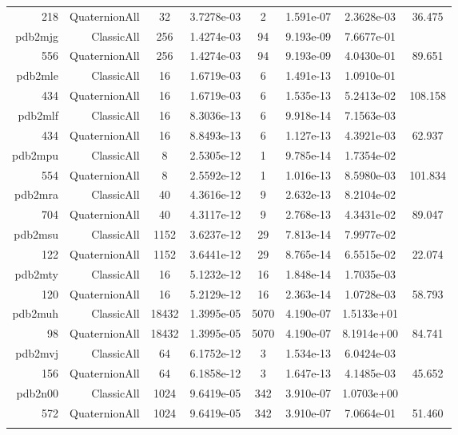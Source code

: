 \begin{xltabular}{\textwidth}{r|rcS[table-format=1.4e+2]cS[table-format=1.3e+2]S[table-format=1.4e+2]S[table-format=-1.3]}
218 & QuaternionAll & 32 & 3.7278e-03 & 2 & 1.591e-07 & 2.3628e-03 & 36.475\\  \addlinespace
pdb2mjg & ClassicAll & 256 & 1.4274e-03 & 94 & 9.193e-09 & 7.6677e-01 & \\
556 & QuaternionAll & 256 & 1.4274e-03 & 94 & 9.193e-09 & 4.0430e-01 & 89.651\\  \addlinespace
pdb2mle & ClassicAll & 16 & 1.6719e-03 & 6 & 1.491e-13 & 1.0910e-01 & \\
434 & QuaternionAll & 16 & 1.6719e-03 & 6 & 1.535e-13 & 5.2413e-02 & 108.158\\  \addlinespace
pdb2mlf & ClassicAll & 16 & 8.3036e-13 & 6 & 9.918e-14 & 7.1563e-03 & \\
434 & QuaternionAll & 16 & 8.8493e-13 & 6 & 1.127e-13 & 4.3921e-03 & 62.937\\  \addlinespace
pdb2mpu & ClassicAll & 8 & 2.5305e-12 & 1 & 9.785e-14 & 1.7354e-02 & \\
554 & QuaternionAll & 8 & 2.5592e-12 & 1 & 1.016e-13 & 8.5980e-03 & 101.834\\  \addlinespace
pdb2mra & ClassicAll & 40 & 4.3616e-12 & 9 & 2.632e-13 & 8.2104e-02 & \\
704 & QuaternionAll & 40 & 4.3117e-12 & 9 & 2.768e-13 & 4.3431e-02 & 89.047\\  \addlinespace
pdb2msu & ClassicAll & 1152 & 3.6237e-12 & 29 & 7.813e-14 & 7.9977e-02 & \\
122 & QuaternionAll & 1152 & 3.6441e-12 & 29 & 8.765e-14 & 6.5515e-02 & 22.074\\  \addlinespace
pdb2mty & ClassicAll & 16 & 5.1232e-12 & 16 & 1.848e-14 & 1.7035e-03 & \\
120 & QuaternionAll & 16 & 5.2129e-12 & 16 & 2.363e-14 & 1.0728e-03 & 58.793\\  \addlinespace
pdb2muh & ClassicAll & 18432 & 1.3995e-05 & 5070 & 4.190e-07 & 1.5133e+01 & \\
98 & QuaternionAll & 18432 & 1.3995e-05 & 5070 & 4.190e-07 & 8.1914e+00 & 84.741\\  \addlinespace
pdb2mvj & ClassicAll & 64 & 6.1752e-12 & 3 & 1.534e-13 & 6.0424e-03 & \\
156 & QuaternionAll & 64 & 6.1858e-12 & 3 & 1.647e-13 & 4.1485e-03 & 45.652\\  \addlinespace
pdb2n00 & ClassicAll & 1024 & 9.6419e-05 & 342 & 3.910e-07 & 1.0703e+00 & \\
572 & QuaternionAll & 1024 & 9.6419e-05 & 342 & 3.910e-07 & 7.0664e-01 & 51.460\\  \addlinespace

\end{xltabular}
